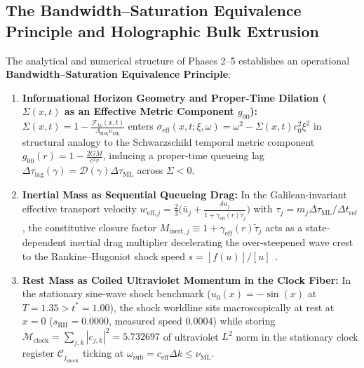 \documentclass[11pt,a4paper]{article}
\theoremstyle{definition}
\begin{document}
\subsection{The Bandwidth--Saturation Equivalence Principle and Holographic Bulk Extrusion}
\label{subsec:equivalence-principle}
The analytical and numerical structure of Phases 2--5 establishes an operational \textbf{Bandwidth--Saturation Equivalence Principle}:
\begin{enumerate}
\item \textbf{Informational Horizon Geometry and Proper-Time Dilation ($\Sigma(x,t)$ as an Effective Metric Component $g_{00}$):} $\Sigma(x, t) = 1 - \frac{\mathcal{F}_{tx}(x,t)}{\Lambda_{\text{Bek}} \nu_{\text{ML}}}$ enters $\sigma_{\text{eff}}(x, t; \xi, \omega) = \omega^2 - \Sigma(x, t) c_0^2 \xi^2$ in structural analogy to the Schwarzschild temporal metric component $g_{00}(r) = 1 - \frac{2GM}{c^2 r}$, inducing a proper-time queueing lag $\Delta\tau_{\text{lag}}(\gamma) = \mathcal{D}(\gamma)\Delta\tau_{\text{ML}}$ across $\Sigma < 0$.
\item \textbf{Inertial Mass as Sequential Queueing Drag:} In the Galilean-invariant effective transport velocity $w_{\text{eff}, j} = \frac{2}{3} \big( \bar{u}_j + \frac{\delta u_j}{1 + \gamma_{\text{eff}}(r) \tilde{\tau}_j} \big)$ with $\tau_j = m_j \Delta\tau_{\text{ML}} / \Delta t_{\text{ref}}$, the constitutive closure factor $M_{\text{inert}, j} \equiv 1 + \gamma_{\text{eff}}(r) \tilde{\tau}_j$ acts as a state-dependent inertial drag multiplier decelerating the over-steepened wave crest to the Rankine--Hugoniot shock speed $s = [f(u)]/[u]$~\cite{lax1973}.
\item \textbf{Rest Mass as Coiled Ultraviolet Momentum in the Clock Fiber:} In the stationary sine-wave shock benchmark ($u_0(x) = -\sin(x)$ at $T = 1.35 > t^* = 1.00$), the shock worldline sits macroscopically at rest at $x = 0$ ($s_{\text{RH}} = 0.0000$, measured speed $0.0004$) while storing $\mathcal{M}_{\text{clock}} = \sum_{j,k} |c_{j,k}|^2 = 5.732697$ of ultraviolet $L^2$ norm in the stationary clock register $\mathcal{C}_{j_{\text{shock}}}$ ticking at $\omega_{\text{sub}} = c_{\text{eff}}\Delta k \le \nu_{\text{ML}}$.
\end{enumerate}
\end{document}
